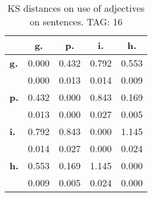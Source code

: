 \begin{table}[h!]
\begin{center}
\begin{tabular}{| l || c | c | c | c |}\hline
 & {\bf g.} & {\bf p.} & {\bf i.} & {\bf h.} \\\hline\hline
{\bf g.} & 0.000 & 0.432 & 0.792 & 0.553 \\
{\bf } & 0.000 & 0.013 & 0.014 & 0.009 \\\hline
{\bf p.} & 0.432 & 0.000 & 0.843 & 0.169 \\
{\bf } & 0.013 & 0.000 & 0.027 & 0.005 \\\hline
{\bf i.} & 0.792 & 0.843 & 0.000 & 1.145 \\
{\bf } & 0.014 & 0.027 & 0.000 & 0.024 \\\hline
{\bf h.} & 0.553 & 0.169 & 1.145 & 0.000 \\
{\bf } & 0.009 & 0.005 & 0.024 & 0.000 \\\hline
\end{tabular}
\caption{KS distances on use of adjectives on sentences. TAG: 16}
\end{center}
\end{table}